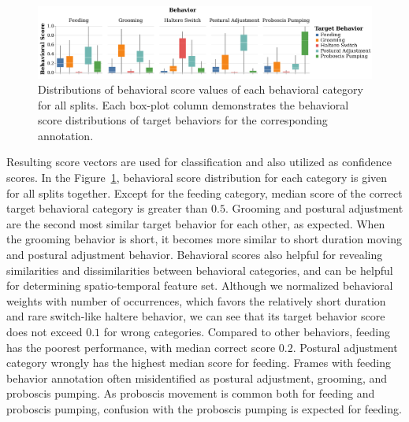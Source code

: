 \begin{figure}[htb!]
	\centering
	\includegraphics[width=\linewidth]{figures/BehavioralScoresDistributions_perBehavior.pdf}
	\caption[Distributions of behavioral score values of each behavioral category for all splits.]{Distributions of behavioral score values of each behavioral category for all splits.
		Each box-plot column demonstrates the behavioral score distributions of target behaviors for the corresponding annotation.\label{figure:behavioral-score-distributions}}
\end{figure}

Resulting score vectors are used for classification and also utilized as confidence scores.
In the Figure~\ref{figure:behavioral-score-distributions}, behavioral score distribution for each category is given for all splits together.
Except for the feeding category, median score of the correct target behavioral category is greater than $0.5$.
Grooming and postural adjustment are the second most similar target behavior for each other, as expected.
When the grooming behavior is short, it becomes more similar to short duration moving and postural adjustment behavior.
Behavioral scores also helpful for revealing similarities and dissimilarities between behavioral categories, and can be helpful for determining spatio-temporal feature set.
Although we normalized behavioral weights with number of occurrences, which favors the relatively short duration and rare switch-like haltere behavior, we can see that its target behavior score does not exceed $0.1$ for wrong categories.
Compared to other behaviors, feeding has the poorest performance, with median correct score $0.2$.
Postural adjustment category wrongly has the highest median score for feeding.
Frames with feeding behavior annotation often misidentified as postural adjustment, grooming, and proboscis pumping.
As proboscis movement is common both for feeding and proboscis pumping, confusion with the proboscis pumping is expected for feeding.

